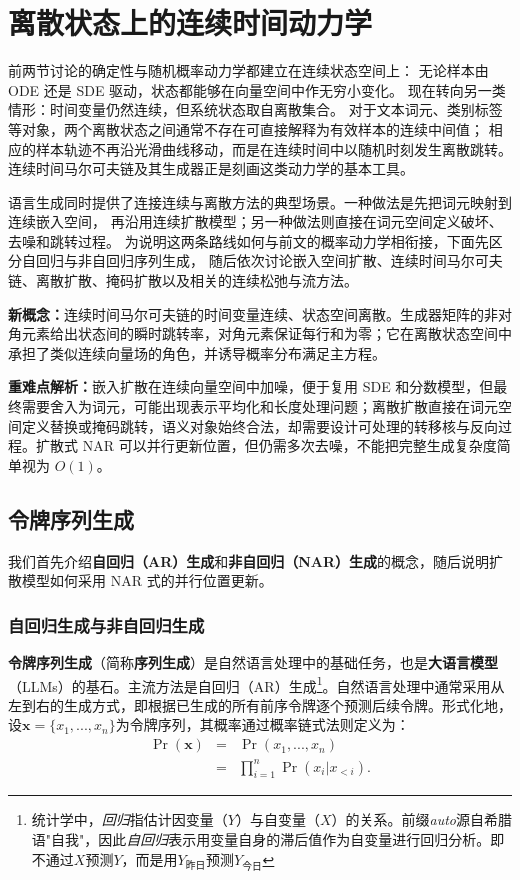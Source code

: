 \section{离散状态上的连续时间动力学}
\label{sec:diffusion-models-in-language}

前两节讨论的确定性与随机概率动力学都建立在连续状态空间上：
无论样本由 ODE 还是 SDE 驱动，状态都能够在向量空间中作无穷小变化。
现在转向另一类情形：时间变量仍然连续，但系统状态取自离散集合。
对于文本词元、类别标签等对象，两个离散状态之间通常不存在可直接解释为有效样本的连续中间值；
相应的样本轨迹不再沿光滑曲线移动，而是在连续时间中以随机时刻发生离散跳转。
连续时间马尔可夫链及其生成器正是刻画这类动力学的基本工具。

语言生成同时提供了连接连续与离散方法的典型场景。一种做法是先把词元映射到连续嵌入空间，
再沿用连续扩散模型；另一种做法则直接在词元空间定义破坏、去噪和跳转过程。
为说明这两条路线如何与前文的概率动力学相衔接，下面先区分自回归与非自回归序列生成，
随后依次讨论嵌入空间扩散、连续时间马尔可夫链、离散扩散、掩码扩散以及相关的连续松弛与流方法。

\begin{importantnote}
\textbf{新概念：}连续时间马尔可夫链的时间变量连续、状态空间离散。生成器矩阵的非对角元素给出状态间的瞬时跳转率，对角元素保证每行和为零；它在离散状态空间中承担了类似连续向量场的角色，并诱导概率分布满足主方程。

\textbf{重难点解析：}嵌入扩散在连续向量空间中加噪，便于复用 SDE 和分数模型，但最终需要舍入为词元，可能出现表示平均化和长度处理问题；离散扩散直接在词元空间定义替换或掩码跳转，语义对象始终合法，却需要设计可处理的转移核与反向过程。扩散式 NAR 可以并行更新位置，但仍需多次去噪，不能把完整生成复杂度简单视为 \(O(1)\)。
\end{importantnote}

\subsection{令牌序列生成}

我们首先介绍\textbf{自回归（AR）生成}和\textbf{非自回归（NAR）生成}的概念，随后说明扩散模型如何采用 NAR 式的并行位置更新。
\subsubsection{自回归生成与非自回归生成}

\textbf{令牌序列生成}（简称\textbf{序列生成}）是自然语言处理中的基础任务，也是\textbf{大语言模型}（LLMs）的基石\citep{radford-etal:2018improving}。主流方法是自回归（AR）生成\footnote{统计学中，\textit{回归}指估计因变量（$Y$）与自变量（$X$）的关系。前缀\textit{auto}源自希腊语"自我"，因此\textit{自回归}表示用变量自身的滞后值作为自变量进行回归分析。即不通过$X$预测$Y$，而是用$Y_{\text{昨日}}$预测$Y_{\text{今日}}$}。自然语言处理中通常采用从左到右的生成方式，即根据已生成的所有前序令牌逐个预测后续令牌。形式化地，设$\mathbf{x} = \{x_1,...,x_n\}$为令牌序列，其概率通过概率链式法则定义为：
\begin{eqnarray}
\Pr(\mathbf{x}) & = & \Pr(x_1,...,x_n) \nonumber \\
& = & \prod_{i=1}^{n} \Pr(x_i|x_{<i}).
\end{eqnarray}

